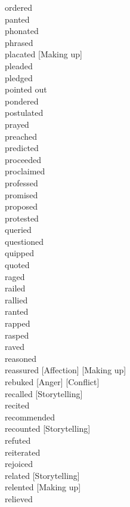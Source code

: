 \documentclass[a4paper,12pt,fleqn]{book}\usepackage{polyglossia}\setdefaultlanguage[babelshorthands=true]{russian}\setotherlanguage{english}\defaultfontfeatures{Ligatures=TeX,Mapping=tex-text}\usepackage{xcolor}\newcommand{\ml}[3]{#2}
\begin{document}
{ordered \hfill \\
panted \hfill \\
phonated \hfill \\
phrased \hfill \\
placated [Making up] \hfill \\
pleaded \hfill \\
pledged \hfill \\
pointed out \hfill \\
pondered \hfill \\
postulated \hfill \\
prayed \hfill \\
preached \hfill \\
predicted \hfill \\
proceeded \hfill \\
proclaimed \hfill \\
professed \hfill \\
promised \hfill \\
proposed \hfill \\
protested \hfill \\
queried \hfill \\
questioned \hfill \\
quipped \hfill \\
quoted \hfill \\
raged \hfill \\
railed \hfill \\
rallied \hfill \\
ranted \hfill \\
rapped \hfill \\
rasped \hfill \\
raved \hfill \\
reasoned \hfill \\
reassured [Affection] [Making up] \hfill \\
rebuked [Anger] [Conflict] \hfill \\
recalled [Storytelling] \hfill \\
recited \hfill \\
recommended \hfill \\
recounted [Storytelling] \hfill \\
refuted \hfill \\
reiterated \hfill \\
rejoiced \hfill \\
related [Storytelling] \hfill \\
relented [Making up] \hfill \\
relieved \hfill \\
}
\end{document}
